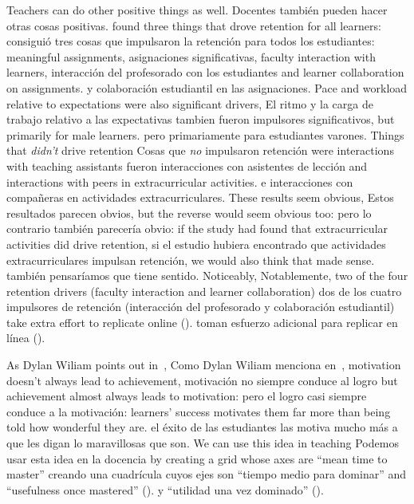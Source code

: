 Teachers can do other positive things as well.
Docentes también pueden hacer otras cosas positivas.
\cite{Bark2014} found three things that drove retention for all learners:
\cite{Bark2014} consiguió tres cosas que impulsaron la retención para todos los estudiantes:
meaningful assignments,
asignaciones significativas,
faculty interaction with learners,
interacción del profesorado con los estudiantes
and learner collaboration on assignments.
y colaboración estudiantil en las asignaciones.
Pace and workload relative to expectations were also significant drivers,
El ritmo y la carga de trabajo relativo a las expectativas tambien fueron impulsores significativos,
but primarily for male learners.
pero primariamente para estudiantes varones.
Things that \emph{didn't} drive retention
Cosas que \emph{no} impulsaron retención
were interactions with teaching assistants
fueron interacciones con asistentes de lección
and interactions with peers in extracurricular activities.
e interacciones con compañeras en actividades extracurriculares.
These results seem obvious,
Estos resultados parecen obvios,
but the reverse would seem obvious too:
pero lo contrario también parecería obvio:
if the study had found that extracurricular activities did drive retention,
si el estudio hubiera encontrado que actividades extracurriculares impulsan retención,
we would also think that made sense.
también pensaríamos que tiene sentido.
Noticeably,
Notablemente,
two of the four retention drivers (faculty interaction and learner collaboration)
dos de los cuatro impulsores de retención (interacción del profesorado y colaboración estudiantil)
take extra effort to replicate online ().
toman esfuerzo adicional para replicar en línea ().


As Dylan Wiliam points out in~\cite{Hend2017},
Como Dylan Wiliam menciona en~\cite{Hend2017},
motivation doesn't always lead to achievement,
motivación no siempre conduce al logro 
but achievement almost always leads to motivation:
pero el logro casi siempre conduce a la motivación:
learners' success motivates them far more than being told how wonderful they are.
el éxito de las estudiantes las motiva mucho más a que les digan lo maravillosas que son.
We can use this idea in teaching
Podemos usar esta idea en la docencia
by creating a grid whose axes are ``mean time to master''
creando una cuadrícula cuyos ejes son ``tiempo medio para dominar”
and ``usefulness once mastered'' ().
y ``utilidad una vez dominado” ().

